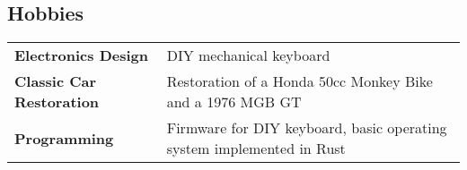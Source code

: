 \documentclass[a4paper, oneside, final]{scrartcl}
\begin{document}
\begin{center}

\section{Hobbies}

\begin{tabularx}{0.9\linewidth}{
    >{\raggedright\bfseries\arraybackslash}b{4.2cm}
    >{\raggedright\arraybackslash}X
}
    Electronics Design & DIY mechanical keyboard\\
    Classic Car Restoration & Restoration of a Honda 50cc Monkey Bike and a
    1976 MGB GT\\
    Programming & Firmware for DIY keyboard, basic operating system implemented
    in Rust
\end{tabularx}


\end{center}
\end{document}
